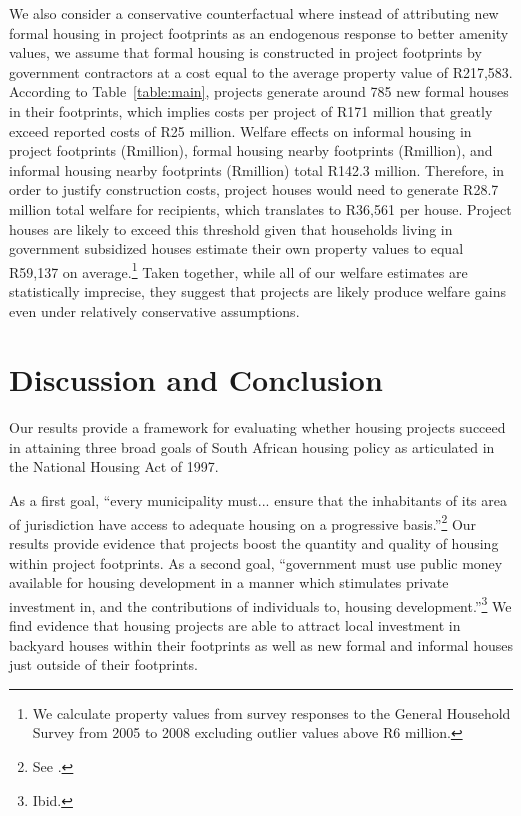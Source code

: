 \documentclass[12pt]{article}
\begin{document}
We also consider a conservative counterfactual where instead of attributing new formal housing in project footprints as an endogenous response to better amenity values, we assume that formal housing is constructed in project footprints by government contractors at a cost equal to the average property value of R217,583.  According to Table~\ref{table:main}, projects generate around 785 new formal houses in their footprints, which implies costs per project of R171 million that greatly exceed reported costs of R25 million.  Welfare effects on informal housing in project footprints (Rmillion), formal housing nearby footprints (Rmillion), and informal housing nearby footprints (Rmillion) total R142.3 million.  Therefore, in order to justify construction costs, project houses would need to generate R28.7 million total welfare for recipients, which translates to R36,561 per house.  Project houses are likely to exceed this threshold given that households living in government subsidized houses estimate their own property values to equal R59,137 on average.\footnote{We calculate property values from survey responses to the General Household Survey from 2005 to 2008 excluding outlier values above R6 million.}   Taken together, while all of our welfare estimates are statistically imprecise, they suggest that projects are likely produce welfare gains even under relatively conservative assumptions.


\section{Discussion and Conclusion}\label{section:discussion}


Our results provide a framework for evaluating whether housing projects succeed in attaining three broad goals of South African housing policy as articulated in the National Housing Act of 1997.

As a first goal, ``every municipality must... ensure that the inhabitants of its area of jurisdiction have access to adequate housing on a progressive basis.''\footnote{See \cite{housingact}.}  Our results provide evidence that projects boost the quantity and quality of housing within project footprints.  As a second goal, ``government must use public money available for housing development in a manner which stimulates private investment in, and the contributions of individuals to, housing development.''\footnote{Ibid.}    We find evidence that housing projects are able to attract local investment in backyard houses within their footprints as well as new formal and informal houses just outside of their footprints.  
\end{document}
